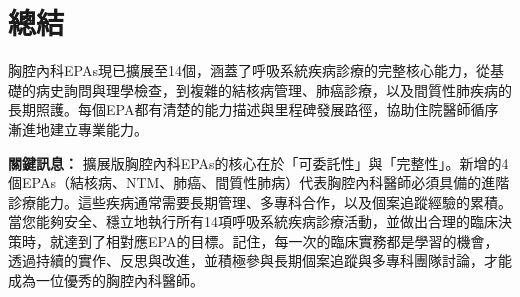 \documentclass[12pt,a4paper]{article}
\begin{document}
\section{總結}

胸腔內科EPAs現已擴展至14個，涵蓋了呼吸系統疾病診療的完整核心能力，從基礎的病史詢問與理學檢查，到複雜的結核病管理、肺癌診療，以及間質性肺疾病的長期照護。每個EPA都有清楚的能力描述與里程碑發展路徑，協助住院醫師循序漸進地建立專業能力。

\begin{importantbox}
\textbf{關鍵訊息：} 擴展版胸腔內科EPAs的核心在於「可委託性」與「完整性」。新增的4個EPAs（結核病、NTM、肺癌、間質性肺病）代表胸腔內科醫師必須具備的進階診療能力。這些疾病通常需要長期管理、多專科合作，以及個案追蹤經驗的累積。當您能夠安全、穩立地執行所有14項呼吸系統疾病診療活動，並做出合理的臨床決策時，就達到了相對應EPA的目標。記住，每一次的臨床實務都是學習的機會，透過持續的實作、反思與改進，並積極參與長期個案追蹤與多專科團隊討論，才能成為一位優秀的胸腔內科醫師。
\end{importantbox}

\end{document}
